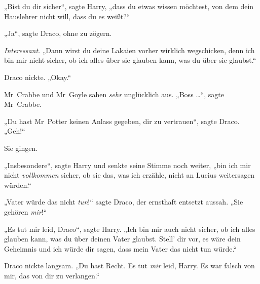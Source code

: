 „Bist du dir sicher“, sagte Harry, „dass du etwas wissen möchtest, von dem dein Hauslehrer nicht will, dass du es weißt?“

„Ja“, sagte Draco, ohne zu zögern.

\emph{Interessant}.
„Dann wirst du deine Lakaien vorher wirklich wegschicken, denn ich bin mir nicht sicher, ob ich alles über sie glauben kann, was du über sie glaubst.“

Draco nickte.
„Okay.“

Mr~Crabbe und Mr~Goyle sahen \emph{sehr} unglücklich aus.
„Boss …“, sagte Mr~Crabbe.

„Du hast Mr~Potter keinen Anlass gegeben, dir zu vertrauen“, sagte Draco.
„Geh!“

Sie gingen.

„Insbesondere“, sagte Harry und senkte seine Stimme noch weiter, „bin ich mir nicht \emph{vollkommen} sicher, ob sie das, was ich erzähle, nicht an Lucius weitersagen würden.“

„Vater würde das nicht \emph{tun}!“ sagte Draco, der ernsthaft entsetzt aussah.
„Sie gehören \emph{mir}!“

„Es tut mir leid, Draco“, sagte Harry.
„Ich bin mir auch nicht sicher, ob ich alles glauben kann, was du über deinen Vater glaubst. Stell’ dir vor, es wäre dein Geheimnis und ich würde dir sagen, dass mein Vater das nicht tun würde.“

Draco nickte langsam.
„Du hast Recht. Es tut \emph{mir} leid, Harry. Es war falsch von mir, das von dir zu verlangen.“

